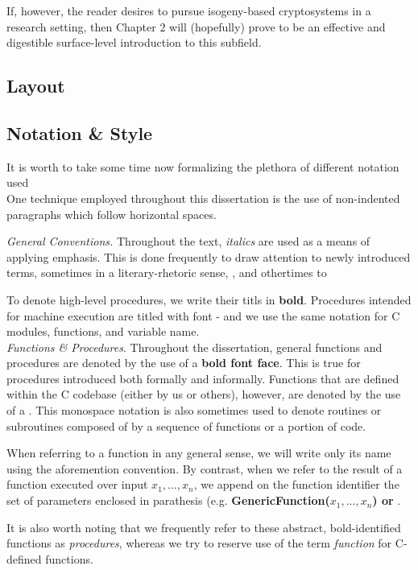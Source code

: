 If, however, the reader desires to pursue isogeny-based cryptosystems in a research setting, then Chapter 2 will (hopefully) prove to be an effective and digestible surface-level introduction to this subfield.  

\subsection{Layout}


\subsection{Notation \& Style}

It is worth to take some time now formalizing the plethora of different notation used\\

One technique employed throughout this dissertation is the use of non-indented paragraphs which follow horizontal spaces. 

\noindent
\textit{General Conventions.} Throughout the text, \textit{italics} are used as a means of applying emphasis. This is done frequently to draw attention to newly introduced terms, sometimes in a literary-rhetoric sense, , and othertimes to 

To denote high-level procedures, we write their titls in \textbf{bold}. Procedures intended for machine execution are titled with  font - and we use the same notation for C modules, functions, and variable name.\\

\noindent
\textit{Functions \& Procedures}. Throughout the dissertation, general functions and procedures are denoted by the use of a \textbf{bold font face}. This is true for procedures introduced both formally and informally. Functions that are defined within the \sidh C codebase (either by us or others), however, are denoted by the use of a . This monospace notation is also sometimes used to denote routines or subroutines composed of by a sequence of functions or a portion of code. 

When referring to a function in any general sense, we will write only its name using the aforemention convention. By contrast, when we refer to the result of a function executed over input $x_{1}, ..., x_{n}$, we append on the function identifier the set of parameters enclosed in parathesis (e.g. \textbf{GenericFunction($x_{1}, ..., x_{n}$) or }. 

It is also worth noting that we frequently refer to these abstract, bold-identified functions as \textit{procedures}, whereas we try to reserve use of the term \textit{function} for C-defined \sidh functions.  

